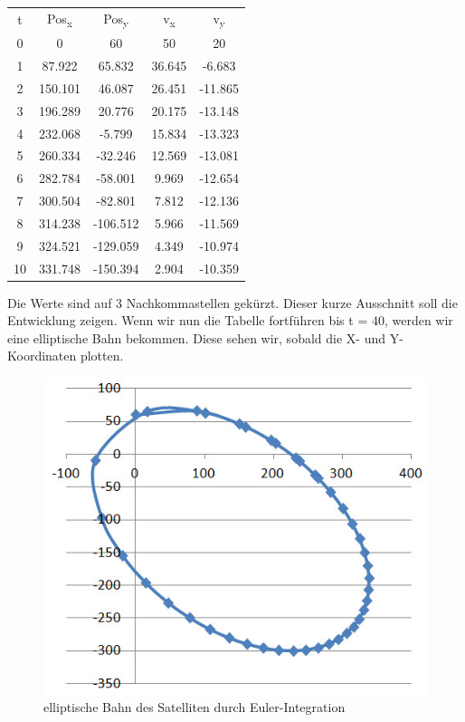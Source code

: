 \documentclass[11pt]{report}
\begin{document}
\begin{tabular}{ccccc}
t & Pos\textsubscript{x} & Pos\textsubscript{y} & v\textsubscript{x} & v\textsubscript{y} \\
0 & 0 & 60 & 50 & 20 \\
1 & 87.922 & 65.832 & 36.645 & -6.683 \\
2 & 150.101 & 46.087 & 26.451 & -11.865 \\
3 & 196.289 & 20.776 & 20.175 & -13.148 \\
4 & 232.068 & -5.799 & 15.834 & -13.323  \\
5 & 260.334 & -32.246 & 12.569 & -13.081 \\
6 & 282.784 & -58.001 & 9.969 & -12.654 \\
7 & 300.504 & -82.801 & 7.812 & -12.136 \\
8 & 314.238 & -106.512 & 5.966 & -11.569 \\
9 & 324.521 & -129.059 & 4.349 & -10.974 \\
10 & 331.748 & -150.394 & 2.904 & -10.359
\end{tabular}
\linebreak

Die Werte sind auf 3 Nachkommastellen gekürzt. Dieser kurze Ausschnitt soll die Entwicklung zeigen. Wenn wir nun die Tabelle fortführen bis t = 40, werden wir eine elliptische Bahn bekommen. Diese sehen wir, sobald die X- und Y-Koordinaten plotten.
\linebreak
\begin{figure}[H]
\centering
\includegraphics[width=13cm]{elliptische_bahn.jpg}
\caption{elliptische Bahn des Satelliten durch Euler-Integration}
\label{fig6}
\end{figure}
\end{document}

